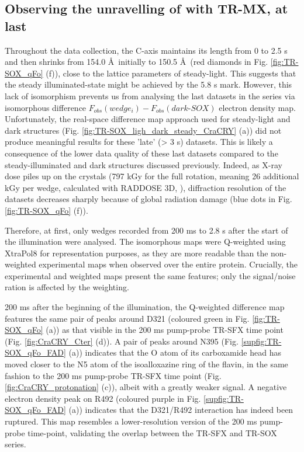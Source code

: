 \subsection{Observing the unravelling of  with TR-MX, at last}

Throughout the data collection, the C-axis maintains its length from 0 to 2.5 s and then shrinks from 154.0 \AA\ initially to 150.5 \AA\ (red diamonds in Fig. \ref{fig:TR-SOX_qFo} (f)), close to the lattice parameters of steady-light. This suggests that the steady illuminated-state might be achieved by the 5.8 s mark. However, this lack of isomorphism prevents us from analysing the last datasets in the series via isomorphous difference \(F_{obs}(wedge_i) - F_{obs}(dark\mbox{-}SOX)\) electron density map. Unfortunately, the real-space difference map approach used for steady-light and dark structures (Fig. \ref{fig:TR-SOX_ligh_dark_steady_CraCRY} (a)) did not produce meaningful results for these 'late' (> 3 s) datasets. This is likely a consequence of the lower data quality of these last datasets compared to the steady-illuminated and dark structures discussed previously. Indeed, as X-ray dose piles up on the crystals (797 kGy for the full rotation, meaning 26 additional kGy per wedge, calculated with RADDOSE 3D, \cite{buryEstimateYourDose2018}), diffraction resolution of the datasets decreases sharply because of global radiation damage (blue dots in Fig. \ref{fig:TR-SOX_qFo} (f)). 


Therefore, at first, only wedges recorded from 200 ms to 2.8 s after the start of the illumination were analysed. The isomorphous maps were Q-weighted \parencite{ursbyImprovedEstimationStructureFactor1997} using XtraPol8 \parencite{dezitterXtrapol8EnablesAutomatic2022} for representation purposes, as they are more readable than the non-weighted experimental maps when observed over the entire protein. Crucially, the experimental and weighted maps present the same features; only the signal/noise ration is affected by the weighting. 

200 ms after the beginning of the illumination, the Q-weighted difference map features the same pair of peaks around D321 (coloured green in Fig. \ref{fig:TR-SOX_qFo} (a)) as that visible in the 200 ms pump-probe TR-SFX time point (Fig. \ref{fig:CraCRY_Cter} (d)). A pair of peaks around N395 (Fig. \ref{supfig:TR-SOX_qFo_FAD} (a)) indicates that the O atom of its carboxamide head has moved closer to the N5 atom of the isoalloxazine ring of the flavin, in the same fashion to the 200 ms pump-probe TR-SFX time point (Fig. \ref{fig:CraCRY_protonation} (c)), albeit with a greatly weaker signal.  A negative electron density peak on R492 (coloured purple in Fig. \ref{supfig:TR-SOX_qFo_FAD} (a)) indicates that the D321/R492 interaction has indeed been ruptured. This map resembles a lower-resolution version of the 200 ms pump-probe time-point, validating the overlap between the TR-SFX and TR-SOX series. 

